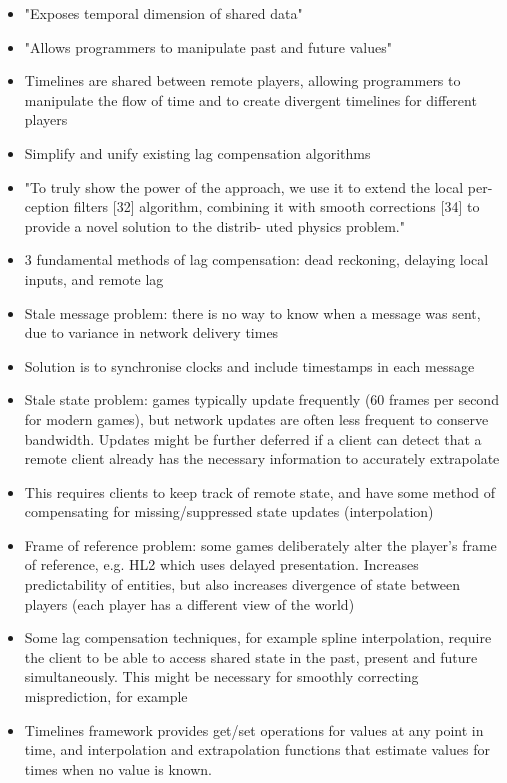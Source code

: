 \documentclass[conference]{IEEEtran}
\begin{document}
	\begin{itemize}
		\item "Exposes temporal dimension of shared data"
		\item "Allows programmers to manipulate past and future values"
		\item Timelines are shared between remote players, allowing programmers to manipulate the flow of time and to create divergent timelines for different players
		\item Simplify and unify existing lag compensation algorithms
		\item "To truly show the power of the approach, we use it to extend the local per- ception filters [32] algorithm, combining it with smooth corrections [34] to provide a novel solution to the distrib- uted physics problem."
		\item 3 fundamental methods of lag compensation: dead reckoning, delaying local inputs, and remote lag
		\item Stale message problem: there is no way to know when a message was sent, due to variance in network delivery times
		\item Solution is to synchronise clocks and include timestamps in each message
		\item Stale state problem: games typically update frequently (60 frames per second for modern games), but network updates are often less frequent to conserve bandwidth. Updates might be further deferred if a client can detect that a remote client already has the necessary information to accurately extrapolate
		\item This requires clients to keep track of remote state, and have some method of compensating for missing/suppressed state updates (interpolation)
		\item Frame of reference problem: some games deliberately alter the player's frame of reference, e.g. HL2 which uses delayed presentation. Increases predictability of entities, but also increases divergence of state between players (each player has a different view of the world)
		\item Some lag compensation techniques, for example spline interpolation, require the client to be able to access shared state in the past, present and future simultaneously. This might be necessary for smoothly correcting misprediction, for example
		\item Timelines framework provides get/set operations for values at any point in time, and interpolation and extrapolation functions that estimate values for times when no value is known.

\end{itemize}
\end{document}
